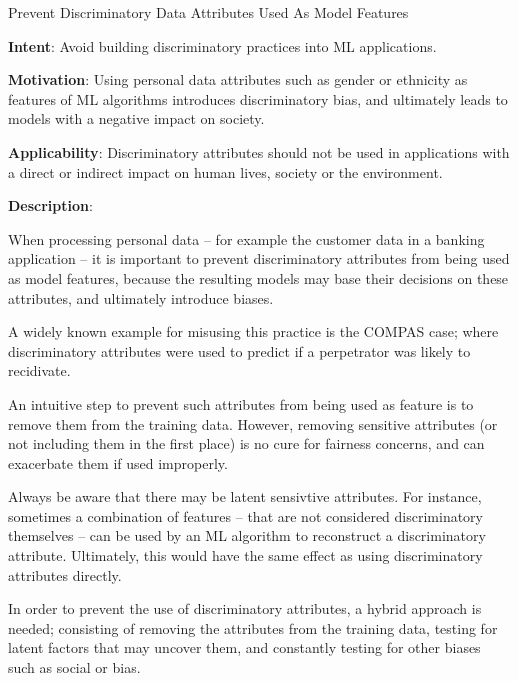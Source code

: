   
  \begin{frame}[plain]{ Prevent Discriminatory Data Attributes Used As Model Features
 }

  \textbf{Intent}: Avoid building discriminatory practices into ML applications. 
 

  \textbf{Motivation}: Using personal data attributes such as gender or ethnicity as features of ML algorithms introduces discriminatory bias, and ultimately leads to models with a negative impact on society. 
 

  \textbf{Applicability}: Discriminatory attributes should not be used in applications with a direct or indirect impact on human lives, society or the environment. 
 

  \textbf{Description}: 

When processing personal data -- for example the customer data in a banking application -- it is important to prevent discriminatory attributes from being used as model features, because the resulting models may base their decisions on these attributes, and ultimately introduce biases.


A widely known example for misusing this practice is the COMPAS case; where discriminatory attributes were used to predict if a perpetrator was likely to recidivate.


An intuitive step to prevent such attributes from being used as feature is to remove them from the training data.
However, removing sensitive attributes (or not including them in the first place) is no cure for fairness concerns, and can exacerbate them if used improperly.


Always be aware that there may be latent sensivtive attributes. For instance, sometimes a combination of features -- that are not considered discriminatory themselves -- can be used by an ML algorithm to reconstruct a discriminatory attribute. Ultimately, this would have the same effect as using discriminatory attributes directly.


In order to prevent the use of discriminatory attributes, a hybrid approach is needed; consisting of removing the attributes from the training data, testing for latent factors that may uncover them, and constantly testing for other biases such as social or  bias.


 


  \end{frame}

